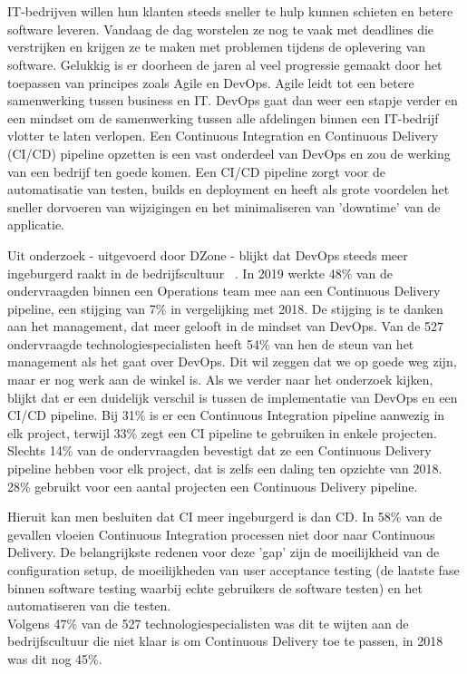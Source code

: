 
\chapter{}
\label{ch:inleiding}

IT-bedrijven willen hun klanten steeds sneller te hulp kunnen schieten en betere software leveren. Vandaag de dag worstelen ze nog te vaak met deadlines die verstrijken en krijgen ze te maken met problemen tijdens de oplevering van software. Gelukkig is er doorheen de jaren al veel progressie gemaakt door het toepassen van principes zoals Agile en DevOps. Agile leidt tot een betere samenwerking tussen business en IT. DevOps gaat dan weer een stapje verder en een mindset om de samenwerking tussen alle afdelingen binnen een IT-bedrijf vlotter te laten verlopen. 
Een Continuous Integration en Continuous Delivery (CI/CD) pipeline opzetten is een vast onderdeel van DevOps en zou de werking van een bedrijf ten goede komen. Een CI/CD pipeline zorgt voor de automatisatie van testen, builds en deployment en heeft als grote voordelen het sneller dorvoeren van wijzigingen en het minimaliseren van 'downtime' van de applicatie.

Uit onderzoek - uitgevoerd door DZone - blijkt dat DevOps steeds meer ingeburgerd raakt in de bedrijfscultuur ~\autocite{Baker2019}. In 2019 werkte 48\% van de ondervraagden binnen een Operations team mee aan een Continuous Delivery pipeline, een stijging van 7\% in vergelijking met 2018.
De stijging is te danken aan het management, dat meer gelooft in de mindset van DevOps. Van de 527 ondervraagde technologiespecialisten heeft 54\% van hen de steun van het management als het gaat over DevOps. Dit wil zeggen dat we op goede weg zijn, maar er nog werk aan de winkel is.
Als we verder naar het onderzoek kijken, blijkt dat er een duidelijk verschil is tussen de implementatie van DevOps en een CI/CD pipeline. 
Bij 31\% is er een Continuous Integration pipeline aanwezig in elk project, terwijl 33\% zegt een CI pipeline te gebruiken in enkele projecten.
Slechts 14\% van de ondervraagden bevestigt dat ze een Continuous Delivery pipeline hebben voor elk project, dat is zelfs een daling ten opzichte van 2018.
28\% gebruikt voor een aantal projecten een Continuous Delivery pipeline.

Hieruit kan men besluiten dat CI meer ingeburgerd is dan CD. In 58\% van de gevallen vloeien Continuous Integration processen niet door naar Continuous Delivery. De belangrijkste redenen voor deze 'gap' zijn de moeilijkheid van de configuration setup, de moeilijkheden van user acceptance testing (de laatste fase binnen software testing waarbij echte gebruikers de software testen) en het automatiseren van die testen.\\
Volgens 47\% van de 527 technologiespecialisten was dit te wijten aan de bedrijfscultuur die niet klaar is om Continuous Delivery toe te passen, in 2018 was dit nog 45\%.

